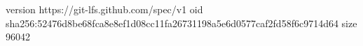 version https://git-lfs.github.com/spec/v1
oid sha256:52476d8be68fca8e8ef1d08cc11fa26731198a5e6d0577caf2fd58f6c9714d64
size 96042
